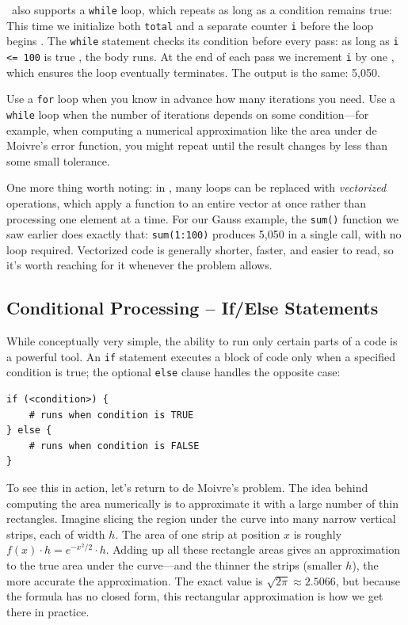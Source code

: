 \R\ also supports a \lstinline{while} loop, which repeats as long as a
condition remains true:
This time we initialize both \lstinline{total} and a separate counter
\lstinline{i} before the loop begins . The \lstinline{while}
statement checks its condition before every pass: as long as
\lstinline{i <= 100} is true , the body runs. At the end of
each pass we increment \lstinline{i} by one , which ensures
the loop eventually terminates. The output is the same: 5,050.

Use a \lstinline{for} loop when you know in advance how many iterations you
need. Use a \lstinline{while} loop when the number of iterations depends on
some condition---for example, when computing a numerical approximation
like the area under de Moivre's error function, you might repeat until the
result changes by less than some small tolerance.

One more thing worth noting: in \R, many loops can be replaced with
\emph{vectorized} operations, which apply a function to an entire vector at
once rather than processing one element at a time. For our Gauss example,
the \lstinline{sum()} function we saw earlier does exactly that:
\lstinline{sum(1:100)} produces 5,050 in a single call, with no loop
required. Vectorized code is generally shorter, faster, and easier to read,
so it's worth reaching for it whenever the problem allows.

\subsection{Conditional Processing -- If/Else Statements}
While conceptually very simple, the ability to run only certain parts of a code is a
powerful tool. An \lstinline{if} statement executes a block of code only when a
specified condition is true; the optional \lstinline{else} clause handles the
opposite case:
\begin{lstlisting}
if (<condition>) {
    # runs when condition is TRUE
} else {
    # runs when condition is FALSE
}
\end{lstlisting}
To see this in action, let's return to de Moivre's problem. The idea behind
computing the area numerically is to approximate it with a large number of
thin rectangles. Imagine slicing the region under the curve into many narrow
vertical strips, each of width $h$. The area of one strip at position $x$ is
roughly $f(x) \cdot h = e^{-x^2/2} \cdot h$. Adding up all these rectangle
areas gives an approximation to the true area under the curve---and the
thinner the strips (smaller $h$), the more accurate the approximation.
The exact value is $\sqrt{2\pi} \approx 2.5066$, but because the formula has
no closed form, this rectangular approximation is how we get there in practice.

